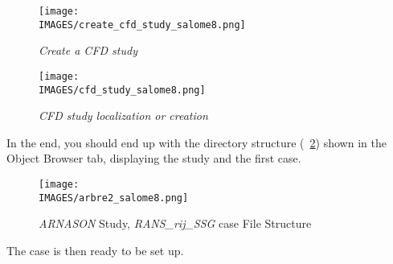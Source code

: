 \begin{figure}[h]
	\begin{minipage}[c]{.46\linewidth}
		\centering
		\texttt{[image: \\IMAGES/create\_cfd\_study\_salome8.png]}
		\caption{\textit{Create a CFD study}}
		\label{lag:create_cfd.png}
	\end{minipage}
	\hfill%
	\begin{minipage}[c]{.40\linewidth}
		\centering
		\texttt{[image: \\IMAGES/cfd\_study\_salome8.png]}
		\caption{\textit{CFD study localization or creation}}
		\label{lag:cfd_study}
	\end{minipage}
\end{figure}


In the end, you should end up with the directory structure (\figurename~\ref{lag:arbre_cfd_study}) shown in the Object Browser tab, displaying the study and the first case.

\begin{figure}[H]
	\centering
	\texttt{[image: \\IMAGES/arbre2\_salome8.png]}
	\caption{\textit{ARNASON} Study, \textit{RANS\_rij\_SSG} case File Structure}\label{lag:arbre_cfd_study}
\end{figure} 

The case is then ready to be set up.
